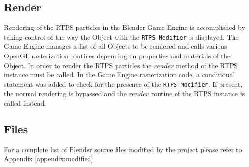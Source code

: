 \subsection{Render}
Rendering of the RTPS particles in the Blender Game Engine is accomplished by
taking control of the way the Object with the \verb|RTPS Modifier| is displayed. The
Game Engine manages a list of all Objects to be rendered and calls various
OpenGL rasterization routines depending on properties and materials of the
Object. In order to render the RTPS particles the $render$ method of the RTPS
instance must be called. In the Game Engine rasterization code, a conditional
statement was added to check for the presence of the \verb|RTPS Modifier|. If
present, the normal rendering is bypassed and the $render$ routine of the RTPS
instance is called instead.

\subsection{Files}
For a complete list of Blender source files modified by the project please
refer to Appendix \ref{appendix:modified} 

